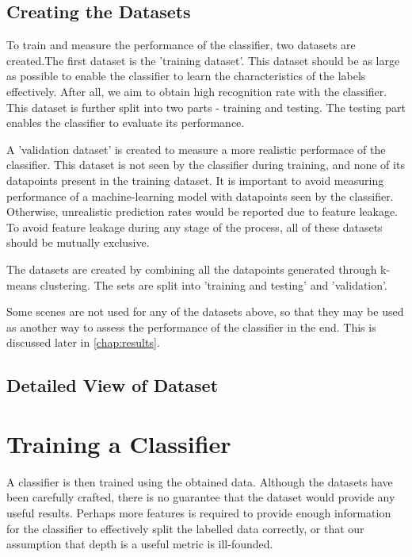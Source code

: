 \subsection{Creating the Datasets}
To train and measure the performance of the classifier, two datasets are created.The first dataset is the 'training dataset'. This dataset should be as large as possible to enable the classifier to learn the characteristics of the labels effectively. After all, we aim to obtain high recognition rate with the classifier. This dataset is further split into two parts - training and testing. The testing part enables the classifier to evaluate its performance.

A 'validation dataset' is created to measure a more realistic performace of the classifier. This dataset is not seen by the classifier during training, and none of its datapoints present in the training dataset. It is important to avoid measuring performance of a machine-learning model with datapoints seen by the classifier. Otherwise, unrealistic prediction rates would be reported due to feature leakage. To avoid feature leakage during any stage of the process, all of these datasets should be mutually exclusive.

The datasets are created by combining all the datapoints generated through k-means clustering. The sets are split into 'training and testing' and 'validation'.

Some scenes are not used for any of the datasets above, so that they may be used as another way to assess the performance of the classifier in the end. This is discussed later in \autoref{chap:results}.

\subsection{Detailed View of Dataset}


\section{Training a Classifier}
A classifier is then trained using the obtained data. Although the datasets have been carefully crafted, there is no guarantee that the dataset would provide any useful results. Perhaps more features is required to provide enough information for the classifier to effectively split the labelled data correctly, or that our assumption that depth is a useful metric is ill-founded.

